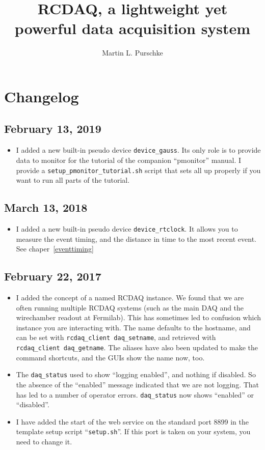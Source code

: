 \documentclass{article}[11pt]
\begin{document}
\title{RCDAQ, a lightweight yet powerful data acquisition system}
\author{Martin L. Purschke}
\maketitle

\tableofcontents

\newpage

\section{Changelog}

\subsection{February 13, 2019}
\begin{itemize}
\item I added a new built-in pseudo device \verb|device_gauss|.  Its
  only role is to provide data to monitor for the tutorial of the
  companion ``pmonitor'' manual. I provide a
  \verb|setup_pmonitor_tutorial.sh| script that sets all up properly if you want
  to run all parts of the tutorial.
\end{itemize}


\subsection{March 13, 2018}
\begin{itemize}
\item I added a new built-in pseudo device \verb|device_rtclock|.  It
  allows you to measure the event timing, and the distance in time to
  the most recent event. See chaper~\ref{eventtiming}
\end{itemize}

\subsection{February 22, 2017}
\begin{itemize}
\item I added the concept of a named RCDAQ instance. We found that we
  are often running multiple RCDAQ systems (such as the main DAQ and
  the wirechamber readout at Fermilab). This has sometimes led to
  confusion which instance you are interacting with. The name
  defaults to the hostname, and can be set with
  \verb|rcdaq_client daq_setname|, and retrieved with
  \verb|rcdaq_client daq_getname|.  The aliases have also been
  updated to make the command shortcuts, and the GUIs show the name
  now, too. 
\item The \verb|daq_status| used to show ``logging enabled'', and nothing if
  disabled. So the absence of the ``enabled'' message indicated
  that we are not logging. That has led to a number of operator
  errors. \verb|daq_status| now shows ``enabled'' or ``disabled''. 
\item I have added the start of the web service on the standard port
  8899 in the template setup script ``\verb|setup.sh|''. If this port
  is taken on your system, you need to change it. 

\end{itemize}
\end{document}
